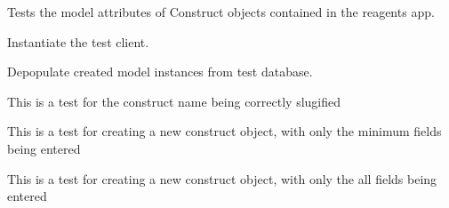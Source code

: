 \documentclass[letterpaper,10pt,english]{sphinxmanual}
\begin{document}

\begin{fulllineitems}
\label{api:experimentdb.reagents.tests.ConstructModelTests}
Tests the model attributes of Construct objects contained in the reagents app.


\begin{fulllineitems}
\label{api:experimentdb.reagents.tests.ConstructModelTests.setUp}
Instantiate the test client.


\end{fulllineitems}


\begin{fulllineitems}
\label{api:experimentdb.reagents.tests.ConstructModelTests.tearDown}
Depopulate created model instances from test database.


\end{fulllineitems}


\begin{fulllineitems}
\label{api:experimentdb.reagents.tests.ConstructModelTests.test_construct_slugify}
This is a test for the construct name being correctly slugified


\end{fulllineitems}


\begin{fulllineitems}
\label{api:experimentdb.reagents.tests.ConstructModelTests.test_create_cell_line_minimal}
This is a test for creating a new construct object, with only the minimum fields being entered


\end{fulllineitems}


\begin{fulllineitems}
\label{api:experimentdb.reagents.tests.ConstructModelTests.test_create_construct_all_fields}
This is a test for creating a new construct object, with only the all fields being entered


\end{fulllineitems}


\end{fulllineitems}
\end{document}
